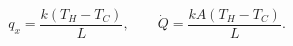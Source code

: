 \begin{equation}\label{ch7:rate}
q_x=\frac{k(T_H-T_C)}{L},\qquad \dot Q=\frac{kA(T_H-T_C)}{L}. \tag{S2 7.3}
\end{equation}
